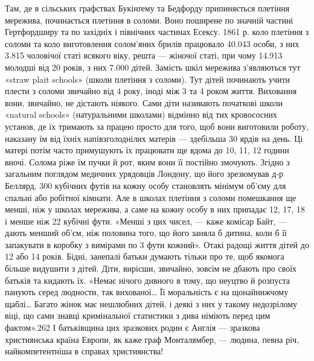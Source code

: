 Там, де в сільських графствах Букінґему та Бедфорду припиняється
плетіння мережива, починається плетіння в соломи. Воно
поширене по значній частині Гертфордширу та по західніх і північних
частинах Есексу. 1861 р. коло плетіння з соломи та коло
виготовлення солом’яних брилів працювало 40.043 особи, з них
3.815 чоловічої статі всякого віку, решта — жіночої статі, при
чому 14.913 молодші від 20 років, з них 7.000 дітей. Замість шкіл
мережива з’являються тут «straw plait schools» (школи плетіння
з соломи). Тут дітей починають учити плести з соломи звичайно
від 4 року, іноді між 3 та 4 роком життя. Виховання вони, звичайно,
не дістають ніякого. Сами діти називають початкові школи
«natural schools» (натуральними школами) відмінно від тих кровососних
установ, де їх тримають за працею просто для того, щоб
вони виготовили роботу, наказану їм від їхніх напівзголоднілих
матерів — здебільша 30 ярдів на день. Ці матері потім часто
примушують їх працювати ще вдома до 10, 11, 12 години вночі.
Солома ріже їм пучки й рот, яким вони її постійно змочують.
Згідно з загальним поглядом медичних урядовців Лондону, що
його зрезюмував д-р Беллярд, 300 кубічних футів на кожну
особу становлять мінімум об’єму для спальні або робітної
кімнати. Але в школах плетіння з соломи помешкання ще менші,
ніж у школах мережива, а саме на кожну особу в них припадає
12, 17, 18 і менше ніж 22 кубічні фути. «Менші з цих чисел, —
каже комісар Байт, — дають менший об’єм, ніж половина того,
що його заняла б дитина, коли б її запакувати в коробку з вимірами
по 3 фути кожний». Отакі радощі життя дітей до 12 або
14 років. Бідні, занепалі батьки думають тільки про те, щоб
якомога більше видушити з дітей. Діти, вирісши, звичайно,
зовсім не дбають про своїх батьків та кидають їх. «Немає нічого
дивного в тому, що неуцтво й розпуста панують серед людности,
так вихованої\dots{} Її моральність є на щонайнижчому щаблі\dots{} Багато
жінок має нешлюбних дітей, і деякі з них у такому недозрілому
віці, що сами знавці кримінальної статистики з дива німіють
перед цим фактом».262 І батьківщина цих зразкових родин є
Англія — зразкова християнська країна Европи, як каже граф
Монталямбер, — людина, певна річ, найкомпетентніша в справах
християнства!
